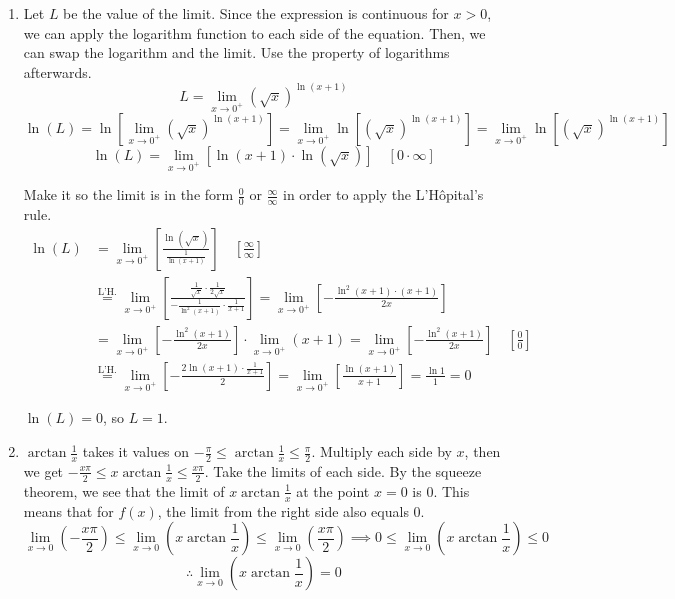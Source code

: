 \documentclass[a4paper, 12pt]{article}
\renewcommand{\headrulewidth}{0pt}
\begin{document}
\newpage
\pagestyle{fancy}
\renewcommand{\headrulewidth}{1pt}


\begin{enumerate}[leftmargin=*,label=\textbf{\arabic*.}]
\item Let $L$ be the value of the limit. Since the expression is continuous for $x>0$, we can apply the logarithm function to each side of the equation. Then, we can swap the logarithm and the limit. Use the property of logarithms afterwards.
\[L=\lim_{x\to0^+}\left(\sqrt x\right)^{\ln\left(x+1\right)}\]
\[\ln(L)=\ln\left[\lim_{x\to0^+}\left(\sqrt x\right)^{\ln\left(x+1\right)}\right]=\lim_{x\to0^+}\ln\left[\left(\sqrt x\right)^{\ln\left(x+1\right)}\right]=\lim_{x\to0^+}\ln\left[\left(\sqrt x\right)^{\ln\left(x+1\right)}\right] \]
\[\ln\left(L\right)=\lim_{x\to0^+}\left[\ln\left(x+1\right)\cdot\ln\left(\sqrt x\right)\right] \quad\left[0\cdot\infty\right]\]

Make it so the limit is in the form $\displaystyle \frac00$ or $\displaystyle \frac\infty\infty$ in order to apply the L'Hôpital's rule.
\begin{align*}\ln\left(L\right)&=\lim_{x\to0^+}\left[\frac{\ln\left(\sqrt x\right)}{\frac1{\ln\left(x+1\right)}}\right] \quad\left[\frac\infty\infty\right]\\[1em]&\overset{\text{L'H.}}{=}\lim_{x\to0^+}\left[\frac{\frac1{\sqrt x}\cdot\frac1{2\sqrt x}}{-\frac1{\ln^2\left(x+1\right)}\cdot \frac1{x+1}}\right]=\lim_{x\to0^+}\left[-\frac{\ln^2(x+1)\cdot(x+1)}{2x}\right]\\[1em]&=\lim_{x\to0^+}\left[-\frac{\ln^2(x+1)}{2x}\right] \cdot\lim_{x\to0^+} \left(x+1\right)=\lim_{x\to0^+}\left[-\frac{\ln^2(x+1)}{2x}\right]\quad\left[\frac00\right]\\[1em]&\overset{\text{L'H.}}{=}\lim_{x\to0^+}\left[-\frac{2\ln(x+1) \cdot\frac1{x+1}}2\right]=\lim_{x\to0^+}\left[\frac{\ln(x+1)}{x+1}\right]=\frac{\ln1}{1}=0\end{align*}

$\ln(L)=0$, so $\boxed{L=1}$.

\item $\displaystyle \arctan\frac1x$ takes it values on $\displaystyle -\frac{\pi}2 \leq \arctan\frac1x \leq \frac{\pi}2$. Multiply each side by $x$, then we get $\displaystyle -\frac{x\pi}2 \leq x\arctan\frac1x \leq \frac{x\pi}2$. Take the limits of each side. By the squeeze theorem, we see that the limit of $\displaystyle x\arctan\frac1x$ at the point $x=0$ is $0$. This means that for $f(x)$, the limit from the right side also equals $0$.
\[\lim_{x\to 0}\left(-\frac{x\pi}2\right)\leq\lim_{x\to 0}\left(x\arctan\frac1x\right)\leq\lim_{x\to 0}\left(\frac{x\pi}2\right)\implies0\leq\lim_{x\to 0}\left(x\arctan\frac1x\right)\leq0\]
\[\therefore\lim_{x\to 0}\left(x\arctan\frac1x\right) = 0\]


\end{enumerate}
\end{document}
